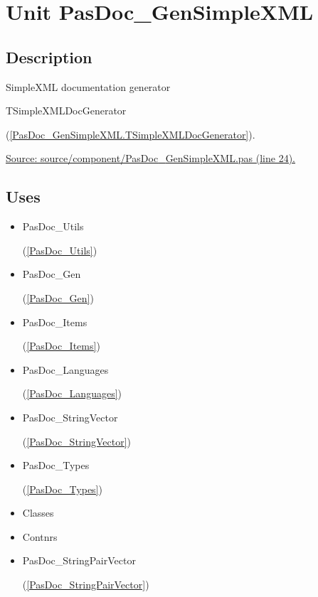 \documentclass{report}
\begin{document}
\chapter{Unit PasDoc{\_}GenSimpleXML}
\label{PasDoc_GenSimpleXML}
\section{Description}
SimpleXML documentation generator \begin{ttfamily}TSimpleXMLDocGenerator\end{ttfamily}(\ref{PasDoc_GenSimpleXML.TSimpleXMLDocGenerator}).\par
\href{https://github.com/pasdoc/pasdoc/blob/master/source/component/PasDoc_GenSimpleXML.pas#L24}{Source: source/component/PasDoc{\_}GenSimpleXML.pas (line 24).}
\section{Uses}
\begin{itemize}
\item \begin{ttfamily}PasDoc{\_}Utils\end{ttfamily}(\ref{PasDoc_Utils})\item \begin{ttfamily}PasDoc{\_}Gen\end{ttfamily}(\ref{PasDoc_Gen})\item \begin{ttfamily}PasDoc{\_}Items\end{ttfamily}(\ref{PasDoc_Items})\item \begin{ttfamily}PasDoc{\_}Languages\end{ttfamily}(\ref{PasDoc_Languages})\item \begin{ttfamily}PasDoc{\_}StringVector\end{ttfamily}(\ref{PasDoc_StringVector})\item \begin{ttfamily}PasDoc{\_}Types\end{ttfamily}(\ref{PasDoc_Types})\item \begin{ttfamily}Classes\end{ttfamily}\item \begin{ttfamily}Contnrs\end{ttfamily}\item \begin{ttfamily}PasDoc{\_}StringPairVector\end{ttfamily}(\ref{PasDoc_StringPairVector})\end{itemize}
\end{document}
